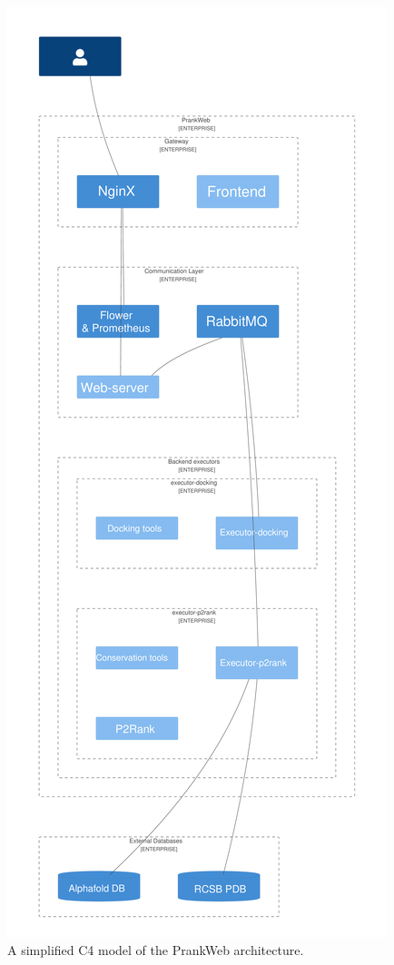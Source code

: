 \begin{figure}[ht]
    \centering
    \includegraphics[height=0.95\textheight]{img/architecture.pdf}
    \caption{A simplified C4 model of the PrankWeb architecture.}
    \label{fig:architecture}
\end{figure}

